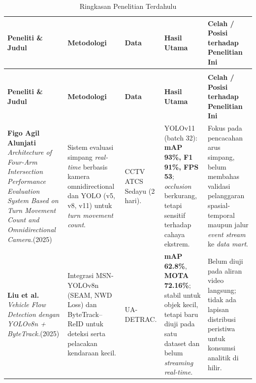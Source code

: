 {\footnotesize
  \setlength{\tabcolsep}{4pt}
  \begin{longtable}{@{}>{\RaggedRight\arraybackslash}p{} >{\RaggedRight\arraybackslash}p{} >{\RaggedRight\arraybackslash}p{} >{\RaggedRight\arraybackslash}p{} >{\RaggedRight\arraybackslash}p{}@{}}
    \caption{Ringkasan Penelitian Terdahulu}
    \label{tab:penelitian_terdahulu} \\
    \toprule
    \textbf{Peneliti \& Judul} & \textbf{Metodologi} & \textbf{Data} & \textbf{Hasil Utama} & \textbf{Celah / Posisi terhadap Penelitian Ini} \\
    \midrule
    \endfirsthead

    \caption[]{Ringkasan Penelitian Terdahulu} \\
    \toprule
    \textbf{Peneliti \& Judul} & \textbf{Metodologi} & \textbf{Data} & \textbf{Hasil Utama} & \textbf{Celah / Posisi terhadap Penelitian Ini} \\
    \midrule
    \endhead

    \midrule
    \endfoot

    \bottomrule
    \endlastfoot

    \textbf{Figo Agil Alunjati \cite{alunjati2025intersection}} \newline
    \textit{Architecture of Four-Arm Intersection Performance Evaluation System Based on Turn Movement Count and Omnidirectional Camera.}(2025) &
    Sistem evaluasi simpang \textit{real-time} berbasis kamera omnidirectional dan YOLO (v5, v8, v11) untuk \textit{turn movement count}. &
    CCTV ATCS Sedayu (2 hari). &
    YOLOv11 (batch 32): \textbf{mAP 93\%, F1 91\%, FPS 53}; \textit{occlusion} berkurang, tetapi sensitif terhadap cahaya ekstrem. &
    Fokus pada pencacahan arus simpang, belum membahas validasi pelanggaran spasial-temporal maupun jalur \textit{event stream} ke \textit{data mart}. \\

    \textbf{Liu et al. \cite{liu2025vehicle}} \newline
    \textit{Vehicle Flow Detection dengan YOLOv8n + ByteTrack.}(2025) &
    Integrasi MSN-YOLOv8n (SEAM, NWD Loss) dan ByteTrack--ReID untuk deteksi serta pelacakan kendaraan kecil. &
    UA-DETRAC. &
    \textbf{mAP 62.8\%}, \textbf{MOTA 72.16\%}; stabil untuk objek kecil, tetapi baru diuji pada satu dataset dan belum \textit{streaming real-time}. &
    Belum diuji pada aliran video langsung; tidak ada lapisan distribusi peristiwa untuk konsumsi analitik di hilir. \\


\end{longtable}}
